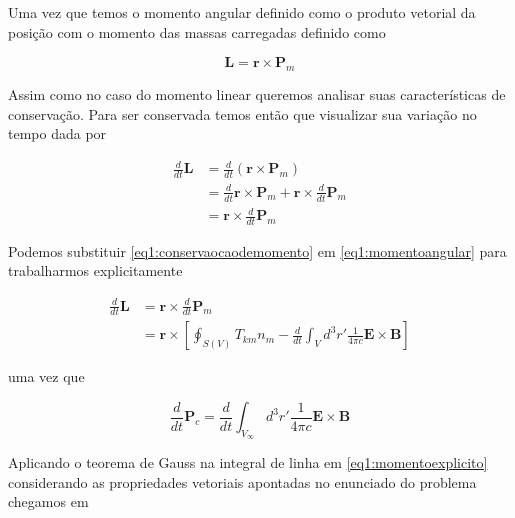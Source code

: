 Uma vez que temos o momento angular definido como o produto vetorial da posição com o momento das massas carregadas definido como

\begin{equation}
	\textbf{L} = \textbf{r} \times \textbf{P}_m
\end{equation}

Assim como no caso do momento linear queremos analisar suas características de conservação. Para ser conservada temos então que visualizar sua variação no tempo dada por


\begin{equation}
	\begin{split}
		\frac{d}{dt}\textbf{L} &= \frac{d}{dt}\left( \textbf{r} \times \textbf{P}_m\right) \\
		& = \frac{d}{dt}\textbf{r} \times \textbf{P}_m + \textbf{r} \times \frac{d}{dt} \textbf{P}_m \\
		& = \textbf{r} \times \frac{d}{dt} \textbf{P}_m
	\end{split}
	\label{eq1:momentoangular}
\end{equation}

Podemos substituir \ref{eq1:conservaocaodemomento} em \ref{eq1:momentoangular} para trabalharmos explicitamente

\begin{equation}
	\begin{split}
		\frac{d}{dt}\textbf{L} & = \textbf{r} \times \frac{d}{dt} \textbf{P}_m \\
		& = \textbf{r} \times\left[ \oint_{S(V)} T_{km} n_m - \frac{d}{dt}\int_V d^3r'\frac{1}{4\pi c} \textbf{E} \times \textbf{B}\right]
		\label{eq1:momentoexplicito}
	\end{split}
\end{equation}

uma vez que

\begin{equation}
	\frac{d}{dt}\textbf{P}_c = \frac{d}{dt}\int_{V_{\infty}} d^3r'\frac{1}{4\pi c} \textbf{E} \times \textbf{B}
\end{equation}

Aplicando o teorema de Gauss na integral de linha em \ref{eq1:momentoexplicito} considerando as propriedades vetoriais apontadas no enunciado do problema chegamos em

